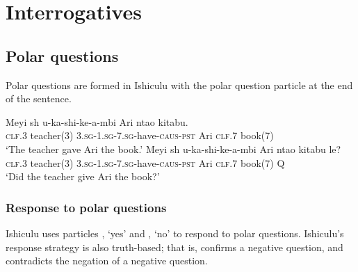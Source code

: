 \chapter{Interrogatives}

\section{Polar questions}

Polar questions are formed in Ishiculu with the polar question particle \textit{} at the end of the sentence.

\begin{exe}
\ex
\begin{xlist}
\ex
\gll Meyi {sh\textramshorns} u-ka-shi-ke-\textbeltl a-mbi Ari nta\textbeltl o kitabu. \\
\textsc{clf.3} teacher(3) \textsc{3.sg}-\textsc{1.sg}-\textsc{7.sg}-have-\textsc{caus}-\textsc{pst} Ari \textsc{clf.7} book(7) \\
\trans `The teacher gave Ari the book.'
\ex
\gll Meyi {sh\textramshorns} u-ka-shi-ke-\textbeltl a-mbi Ari nta\textbeltl o kitabu le? \\
\textsc{clf.3} teacher(3) \textsc{3.sg}-\textsc{1.sg}-\textsc{7.sg}-have-\textsc{caus}-\textsc{pst} Ari \textsc{clf.7} book(7) Q \\
\trans `Did the teacher give Ari the book?'
\end{xlist}
\end{exe}

\subsection{Response to polar questions}

Ishiculu uses particles \textit{}, `yes' and \textit{}, `no' to respond to polar questions. Ishiculu's response strategy is also truth-based; that is, \textit{} confirms a negative question, and \textit{} contradicts the negation of a negative question.

